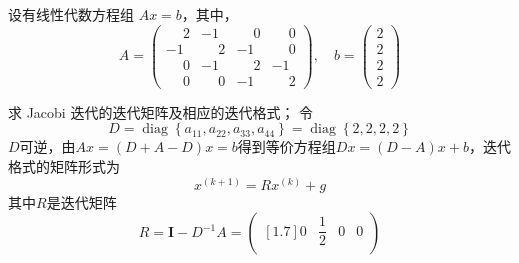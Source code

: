 \documentclass[11pt]{article}
\begin{document}
\maketitle

\thispagestyle{empty}

\newpage

\begin{question}

    \questiontext
    {
        设有线性代数方程组 $Ax = b$，其中，
        \begin{equation*}
            A =
            \begin{pmatrix}
                \phantom{-}2 & -1           & \phantom{-}0 & \phantom{-}0 \\
                -1           & \phantom{-}2 & -1           & \phantom{-}0 \\
                \phantom{-}0 & -1           & \phantom{-}2 & -1           \\
                \phantom{-}0 & \phantom{-}0 & -1           & \phantom{-}2
            \end{pmatrix}
            ,\quad
            b =
            \begin{pmatrix}
                2 \\
                2 \\
                2 \\
                2
            \end{pmatrix}
        \end{equation*}
    }
    \begin{subquestion}{求 Jacobi 迭代的迭代矩阵及相应的迭代格式；}
        \answer
        {
            令
            \begin{equation*}
                D = \operatorname{diag}{\left\{a_{11}, a_{22}, a_{33}, a_{44}\right\}} =\operatorname{diag}{\left\{2, 2, 2, 2\right\}}
            \end{equation*}
            $D$可逆，由$Ax = (D + A - D)x = b$得到等价方程组$Dx = (D - A)x + b$，迭代格式的矩阵形式为
            \begin{equation*}
                x^{(k + 1)} = Rx^{(k)} + g
            \end{equation*}
            其中$R$是迭代矩阵
            \begin{equation*}
                R = \mathbf{I} - D^{-1}A =
                \begin{pmatrix}[1.7]
                    0            & \dfrac{1}{2} & 0            & 0            \\

\end{pmatrix}
\end{equation*}}
\end{subquestion}
\end{question}
\end{document}
